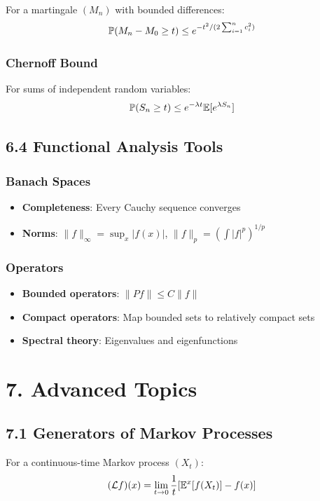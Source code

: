 \documentclass{amsart}
\let\originalmathbb\mathbb
\renewcommand{\mathbb}[1]{%
    \ifstrequal{#1}{1}{\mathbbm{#1}}{\originalmathbb{#1}}%
}
\theoremstyle{plain}
\theoremstyle{definition}
\theoremstyle{remark}
\begin{document}
For a martingale $(M_n)$ with bounded differences:
\[
\mathbb{P}(M_n - M_0 \geq t) \leq e^{-t^2/(2\sum_{i=1}^n c_i^2)}
\]

\subsubsection{Chernoff Bound}

For sums of independent random variables:
\[
\mathbb{P}(S_n \geq t) \leq e^{-\lambda t}\mathbb{E}[e^{\lambda S_n}]
\]

\subsection{6.4 Functional Analysis Tools}

\subsubsection{Banach Spaces}

\begin{itemize}
	\item \textbf{Completeness}: Every Cauchy sequence converges
	\item \textbf{Norms}: $\|f\|_\infty = \sup_x |f(x)|$, $\|f\|_p = (\int |f|^p)^{1/p}$
\end{itemize}

\subsubsection{Operators}

\begin{itemize}
	\item \textbf{Bounded operators}: $\|Pf\| \leq C\|f\|$
	\item \textbf{Compact operators}: Map bounded sets to relatively compact sets
	\item \textbf{Spectral theory}: Eigenvalues and eigenfunctions
\end{itemize}

\section{7. Advanced Topics}

\subsection{7.1 Generators of Markov Processes}

For a continuous-time Markov process $(X_t)$:
\[
(\mathcal{L}f)(x) = \lim_{t \to 0} \frac{1}{t}[\mathbb{E}^x[f(X_t)] - f(x)]
\]
\end{document}
